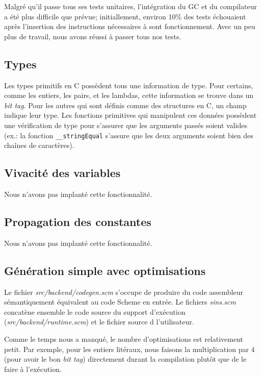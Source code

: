\documentclass[10pt]{report}
\begin{document}
Malgré qu'il passe tous ses tests unitaires, l'intégration du GC et du
compilateur a été plus difficile que prévue; initiallement, environ 10\% des
tests échouaient après l'insertion des instructions nécessaires à sont
fonctionnement. Avec un peu plus de travail, nous avons réussi à passer tous
nos tests.

\subsection{Types}

Les types primitifs en C possèdent tous une information de type.  Pour
certains, comme les entiers, les pairs, et les lambdas, cette
information se trouve dans un {\it bit tag}.  Pour les autres qui sont
définis comme des structures en C, un champ indique leur type.  Les
fonctions primitives qui manipulent ces données possèdent une
vérification de type pour s'assurer que les arguments passés soient
valides (ex.: la fonction {\tt __stringEqual} s'assure que les deux
arguments soient bien des chaînes de caractères).

\subsection{Vivacité des variables}

Nous n'avons pas implanté cette fonctionnalité.

\subsection{Propagation des constantes}

Nous n'avons pas implanté cette fonctionnalité.

\subsection{Génération simple avec optimisations}

Le fichier {\it src/backend/codegen.scm} s'occupe de produire du code
assembleur sémantiquement équivalent au code Scheme en entrée. Le
fichiers {\it sins.scm} concatène ensemble le code source du support
d'exécution ({\it src/backend/runtime.scm}) et le fichier source d
l'utilisateur.

Comme le temps nous a manqué, le nombre d'optimisations est
relativement petit. Par exemple, pour les entiers litéraux, nous
faisons la multiplication par 4 (pour avoir le bon {\it bit tag})
directement durant la compilation plutôt que de le faire à
l'exécution.
\end{document}
